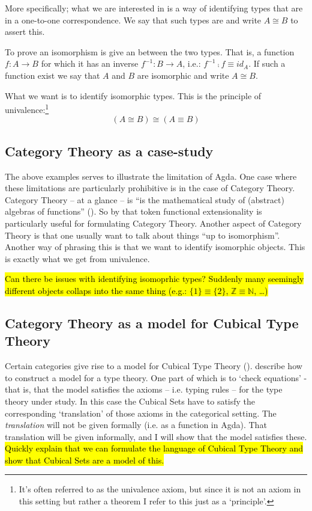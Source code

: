 \documentclass{article}
\newcommand{\mycomment}[1]{\hl{#1}}
\begin{document}
More specifically; what we are interested in is a way of identifying types that
are in a one-to-one correspondence. We say that such types are
 and write $A \cong B$ to assert this.

To prove an isomorphism is give an  between the two types.
That is, a function $f : A \to B$ for which it has an inverse $f^{-1} : B \to
A$, i.e.: $f^{-1} \comp f \equiv id_A$. If such a function exist we say that $A$
and $B$ are isomorphic and write $A \cong B$.

What we want is to identify isomorphic types. This is the principle of
univalence:\footnote{It's often referred to as the univalence axiom, but since
it is not an axiom in this setting but rather a theorem I refer to this just
as a `principle'.}
%
$$(A \cong B) \cong (A \equiv B)$$
%
\subsection{Category Theory as a case-study}
%
The above examples serves to illustrate the limitation of Agda. One case where
these limitations are particularly prohibitive is in the case of Category
Theory. Category Theory -- at a glance -- is ``is the mathematical study of
(abstract) algebras of functions'' (\cite{awodey-2006}). So by that token
functional extensionality is particularly useful for formulating Category
Theory. Another aspect of Category Theory is that one usually want to talk about
things ``up to isomorphism''. Another way of phrasing this is that we want to
identify isomorphic objects. This is exactly what we get from univalence.

\mycomment{Can there be issues with identifying isomoprhic types? Suddenly many
seemingly different objects collaps into the same thing (e.g.: $\{1\} \equiv
\{2\}$, $\mathbb{Z} \equiv \mathbb{N}$, \ldots)}

\subsection{Category Theory as a model for Cubical Type Theory}
%
Certain categories give rise to a model for Cubical Type Theory
(\cite{bezem-2014}). \cite{dybjer-1995} describe how to construct a model for a
type theory. One part of which is to `check equations' - that is, that the model
satisfies the axioms -- i.e. typing rules -- for the type theory under study. In
this case the Cubical Sets have to satisfy the corresponding `translation' of
those axioms in the categorical setting. The \emph{translation} will not be
given formally (i.e. as a function in Agda). That translation will be given
informally, and I will show that the model satisfies these.
%
\mycomment{Quickly explain that we can formulate the language of Cubical Type
Theory and show that Cubical Sets are a model of this.}
%
\end{document}
